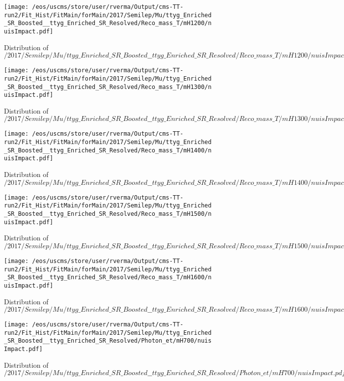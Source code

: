 \begin{figure}
\centering
\texttt{[image: /eos/uscms/store/user/rverma/Output/cms-TT-run2/Fit\_Hist/FitMain/forMain/2017/Semilep/Mu/ttyg\_Enriched\_SR\_Boosted\_\_ttyg\_Enriched\_SR\_Resolved/Reco\_mass\_T/mH1200/nuisImpact.pdf]}
\caption{Distribution of $/2017/Semilep/Mu/ttyg\_Enriched\_SR\_Boosted\_\_ttyg\_Enriched\_SR\_Resolved/Reco\_mass\_T/mH1200/nuisImpact.pdf$}
\end{figure}

\begin{figure}
\centering
\texttt{[image: /eos/uscms/store/user/rverma/Output/cms-TT-run2/Fit\_Hist/FitMain/forMain/2017/Semilep/Mu/ttyg\_Enriched\_SR\_Boosted\_\_ttyg\_Enriched\_SR\_Resolved/Reco\_mass\_T/mH1300/nuisImpact.pdf]}
\caption{Distribution of $/2017/Semilep/Mu/ttyg\_Enriched\_SR\_Boosted\_\_ttyg\_Enriched\_SR\_Resolved/Reco\_mass\_T/mH1300/nuisImpact.pdf$}
\end{figure}

\begin{figure}
\centering
\texttt{[image: /eos/uscms/store/user/rverma/Output/cms-TT-run2/Fit\_Hist/FitMain/forMain/2017/Semilep/Mu/ttyg\_Enriched\_SR\_Boosted\_\_ttyg\_Enriched\_SR\_Resolved/Reco\_mass\_T/mH1400/nuisImpact.pdf]}
\caption{Distribution of $/2017/Semilep/Mu/ttyg\_Enriched\_SR\_Boosted\_\_ttyg\_Enriched\_SR\_Resolved/Reco\_mass\_T/mH1400/nuisImpact.pdf$}
\end{figure}

\begin{figure}
\centering
\texttt{[image: /eos/uscms/store/user/rverma/Output/cms-TT-run2/Fit\_Hist/FitMain/forMain/2017/Semilep/Mu/ttyg\_Enriched\_SR\_Boosted\_\_ttyg\_Enriched\_SR\_Resolved/Reco\_mass\_T/mH1500/nuisImpact.pdf]}
\caption{Distribution of $/2017/Semilep/Mu/ttyg\_Enriched\_SR\_Boosted\_\_ttyg\_Enriched\_SR\_Resolved/Reco\_mass\_T/mH1500/nuisImpact.pdf$}
\end{figure}

\begin{figure}
\centering
\texttt{[image: /eos/uscms/store/user/rverma/Output/cms-TT-run2/Fit\_Hist/FitMain/forMain/2017/Semilep/Mu/ttyg\_Enriched\_SR\_Boosted\_\_ttyg\_Enriched\_SR\_Resolved/Reco\_mass\_T/mH1600/nuisImpact.pdf]}
\caption{Distribution of $/2017/Semilep/Mu/ttyg\_Enriched\_SR\_Boosted\_\_ttyg\_Enriched\_SR\_Resolved/Reco\_mass\_T/mH1600/nuisImpact.pdf$}
\end{figure}

\begin{figure}
\centering
\texttt{[image: /eos/uscms/store/user/rverma/Output/cms-TT-run2/Fit\_Hist/FitMain/forMain/2017/Semilep/Mu/ttyg\_Enriched\_SR\_Boosted\_\_ttyg\_Enriched\_SR\_Resolved/Photon\_et/mH700/nuisImpact.pdf]}
\caption{Distribution of $/2017/Semilep/Mu/ttyg\_Enriched\_SR\_Boosted\_\_ttyg\_Enriched\_SR\_Resolved/Photon\_et/mH700/nuisImpact.pdf$}
\end{figure}

